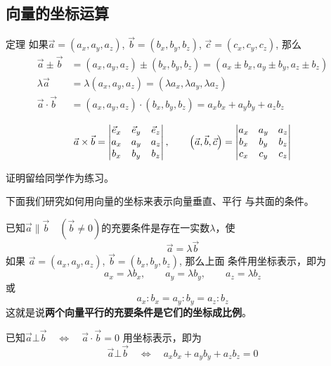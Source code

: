 \subsection{向量的坐标运算}

\begin{blk}{定理}
     如果$\vec{a}=(a_x,a_y,a_z)$, $\vec{b}=(b_x, b_y,b_z)$, 
$\vec{c}=(c_x,c_y,c_z)$, 那么
\[\begin{split}
    \vec{a}\pm \vec{b}&=(a_x,a_y,a_z)\pm (b_x,b_y,b_z)
=(a_x\pm b_x,a_y\pm b_y,a_z\pm b_z)\\
\lambda\vec{a}&=\lambda(a_x, a_y,a_z)=(\lambda a_x,\lambda 
a_y,\lambda a_z)\\
\vec{a}\cdot \vec{b}&=(a_x, a_y, a_z)\cdot (b_x,b_y,b_z)
=a_xb_x+a_yb_y+a_zb_z\\
\end{split}\]
\[\vec{a}\times \vec{b}=\begin{vmatrix}
  \vec{e}_x&\vec{e}_y&\vec{e}_z\\
  a_x&a_y&a_z\\
  b_x&b_y&b_z  
\end{vmatrix},\qquad \left(\vec{a},\vec{b},\vec{c}\right)=\begin{vmatrix}
    a_x&a_y&a_z\\
    b_x&b_y&b_z\\  
    c_x&c_y&c_z
\end{vmatrix}\]
\end{blk}


证明留给同学作为练习。

下面我们研究如何用向量的坐标来表示向量垂直、平行
与共面的条件。

已知$\vec{a}\parallel \vec{b}\quad (\vec{b}\ne 0)$的充要条件是存在一实数$\lambda$，使
$$\vec{a}=\lambda\vec{b}$$
如果
$\vec{a}=(a_x,a_y,a_z)$, $\vec{b}=(b_x,b_y,b_z)$, 那么上面
条件用坐标表示，即为
\begin{equation}
    a_x=\lambda b_x,\qquad  a_y=\lambda b_y,\qquad  a_z=\lambda b_z
\end{equation}
或
\begin{equation}
    a_x:b_x=a_y:b_y=a_z:b_z
\end{equation}
这就是说\textbf{两个向量平行的充要条件是它们的坐标成比例}。

已知$\vec{a}\bot \vec{b}\quad \Longleftrightarrow \quad \vec{a}\cdot \vec{b}=0$
用坐标表示，即为
\begin{equation}
    \vec{a}\bot \vec{b}\quad \Longleftrightarrow \quad a_xb_x+a_yb_y+a_zb_z=0
\end{equation}

